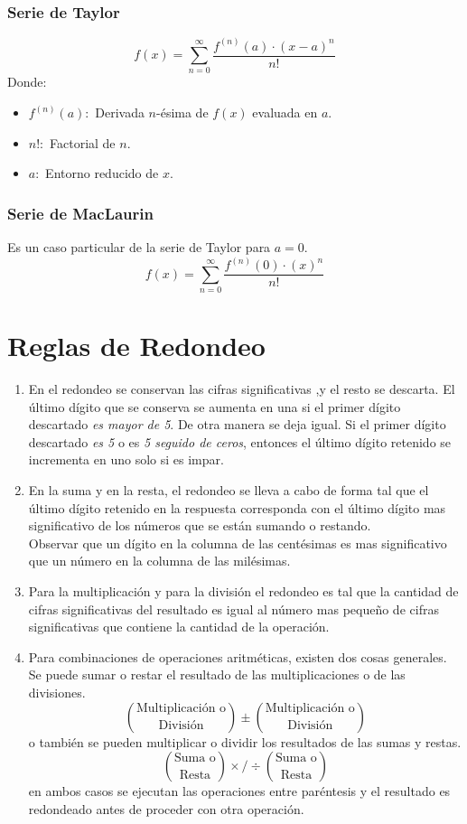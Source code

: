 \subsubsection{Serie de Taylor}
$$f(x)=\displaystyle\sum_{n=0}^{\infty} \dfrac{ f^{(n)}(a) \cdot (x-a)^n}{n!} $$
Donde:
\begin{itemize}
\item $f^{(n)}(a):$ Derivada $n$-ésima de $f(x)$ evaluada en $a$.
\item $n!:$ Factorial de $n$.
\item $a:$ Entorno reducido de $x$.
\end{itemize}
\subsubsection{Serie de MacLaurin}
Es un caso particular de la serie de Taylor para $a=0$.
$$f(x)=\displaystyle\sum_{n=0}^{\infty} \dfrac{ f^{(n)}(0) \cdot (x)^n}{n!} $$
\section{Reglas de Redondeo}
\begin{enumerate}
\item En el redondeo se conservan las cifras significativas ,y el resto se descarta. El último dígito que se conserva se aumenta en una si el primer dígito descartado \textit{es mayor de 5}. De otra manera se deja igual. Si el primer dígito descartado \textit{es 5} o es \textit{5 seguido de ceros}, entonces el último dígito retenido se incrementa en uno solo si es impar.
\item En la suma y en la resta, el redondeo se lleva a cabo de forma tal que el último dígito retenido en la respuesta corresponda con el último dígito mas significativo de los números que se están sumando o restando.\\ Observar que un dígito en la columna de las centésimas es mas significativo que un número en la columna de las milésimas.
\item Para la multiplicación y para la división el redondeo es tal que la cantidad de cifras significativas del resultado es igual al número mas pequeño de cifras significativas que contiene la cantidad de la operación.
\item Para combinaciones de operaciones aritméticas, existen dos cosas generales. Se puede sumar o restar el resultado de las multiplicaciones o de las divisiones.
$$\binom{\textrm{Multiplicación o}}{\textrm{División}}\pm \binom{\textrm{Multiplicación o}}{\textrm{División}}$$
o también se pueden multiplicar o dividir los resultados de las sumas y restas.
$$\binom{\textrm{Suma o}}{\textrm{Resta}} \times / \div \binom{\textrm{Suma o}}{\textrm{Resta}}$$
en ambos casos se ejecutan las operaciones entre paréntesis y el resultado es redondeado antes de proceder con otra operación.
\end{enumerate}